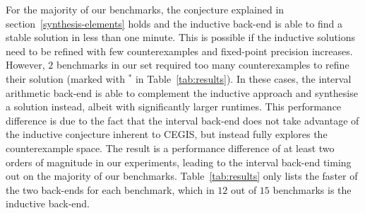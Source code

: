 \documentclass{sig-alternate-05-2015}
\begin{document}
For the majority of our benchmarks, the conjecture explained in
section~\ref{synthesis-elements} holds and the inductive back-end is able to
find a stable solution in less than one minute.  This is possible if the
inductive solutions need to be refined with few counterexamples and
fixed-point precision increases.  However, $2$ benchmarks in our set
required too many counterexamples to refine their solution (marked with $^*$
in Table~\ref{tab:results}).  In these cases, the interval arithmetic
back-end is able to complement the inductive approach and synthesise a
solution instead, albeit with significantly larger runtimes.  This
performance difference is due to the fact that the interval back-end does
not take advantage of the inductive conjecture inherent to CEGIS, but
instead fully explores the counterexample space.  The result is a
performance difference of at least two orders of magnitude in our
experiments, leading to the interval back-end timing out on the majority of
our benchmarks.  Table~\ref{tab:results} only lists the faster of the two
back-ends for each benchmark, which in $12$ out of $15$ benchmarks is the
inductive back-end.
\end{document}
